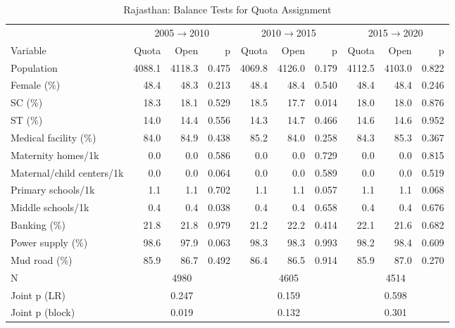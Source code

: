 \begin{table}[htbp]
\caption{Rajasthan: Balance Tests for Quota Assignment}
\label{tab:balance_raj_2005_2010}
{\centering\scriptsize
\begin{tabular}{@{}lrrr rrr rrr@{}}
\toprule
& \multicolumn{3}{c}{2005$\rightarrow$2010} & \multicolumn{3}{c}{2010$\rightarrow$2015} & \multicolumn{3}{c}{2015$\rightarrow$2020} \\
\cmidrule(lr){2-4} \cmidrule(lr){5-7} \cmidrule(lr){8-10}
Variable & Quota & Open & p & Quota & Open & p & Quota & Open & p \\
\midrule
Population & 4088.1 & 4118.3 & 0.475 & 4069.8 & 4126.0 & 0.179 & 4112.5 & 4103.0 & 0.822 \\
Female (\%) & 48.4 & 48.3 & 0.213 & 48.4 & 48.4 & 0.540 & 48.4 & 48.4 & 0.246 \\
SC (\%) & 18.3 & 18.1 & 0.529 & 18.5 & 17.7 & 0.014 & 18.0 & 18.0 & 0.876 \\
ST (\%) & 14.0 & 14.4 & 0.556 & 14.3 & 14.7 & 0.466 & 14.6 & 14.6 & 0.952 \\
Medical facility (\%) & 84.0 & 84.9 & 0.438 & 85.2 & 84.0 & 0.258 & 84.3 & 85.3 & 0.367 \\
Maternity homes/1k & 0.0 & 0.0 & 0.586 & 0.0 & 0.0 & 0.729 & 0.0 & 0.0 & 0.815 \\
Maternal/child centers/1k & 0.0 & 0.0 & 0.064 & 0.0 & 0.0 & 0.589 & 0.0 & 0.0 & 0.519 \\
Primary schools/1k & 1.1 & 1.1 & 0.702 & 1.1 & 1.1 & 0.057 & 1.1 & 1.1 & 0.068 \\
Middle schools/1k & 0.4 & 0.4 & 0.038 & 0.4 & 0.4 & 0.658 & 0.4 & 0.4 & 0.676 \\
Banking (\%) & 21.8 & 21.8 & 0.979 & 21.2 & 22.2 & 0.414 & 22.1 & 21.6 & 0.682 \\
Power supply (\%) & 98.6 & 97.9 & 0.063 & 98.3 & 98.3 & 0.993 & 98.2 & 98.4 & 0.609 \\
Mud road (\%) & 85.9 & 86.7 & 0.492 & 86.4 & 86.5 & 0.914 & 85.9 & 87.0 & 0.270 \\
\midrule
N & \multicolumn{3}{c}{4980} & \multicolumn{3}{c}{4605} & \multicolumn{3}{c}{4514} \\
Joint p (LR) & \multicolumn{3}{c}{0.247} & \multicolumn{3}{c}{0.159} & \multicolumn{3}{c}{0.598} \\
Joint p (block) & \multicolumn{3}{c}{0.019} & \multicolumn{3}{c}{0.132} & \multicolumn{3}{c}{0.301} \\
\bottomrule
\end{tabular}
\par}


\end{table}
